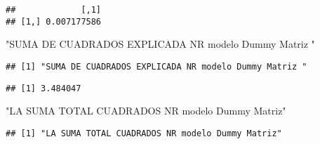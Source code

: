 \documentclass[
]{article}
\newenvironment{Shaded}{\begin{snugshade}}{\end{snugshade}}
\newcommand{\DataTypeTok}[1]{\textcolor[rgb]{0.13,0.29,0.53}{#1}}
\newcommand{\DecValTok}[1]{\textcolor[rgb]{0.00,0.00,0.81}{#1}}
\newcommand{\KeywordTok}[1]{\textcolor[rgb]{0.13,0.29,0.53}{\textbf{#1}}}
\newcommand{\NormalTok}[1]{#1}
\newcommand{\OperatorTok}[1]{\textcolor[rgb]{0.81,0.36,0.00}{\textbf{#1}}}
\newcommand{\StringTok}[1]{\textcolor[rgb]{0.31,0.60,0.02}{#1}}
\begin{document}
\begin{verbatim}
##             [,1]
## [1,] 0.007177586
\end{verbatim}

\begin{Shaded}
\begin{Highlighting}[]
\StringTok{"SUMA DE CUADRADOS EXPLICADA NR modelo Dummy Matriz "}
\end{Highlighting}
\end{Shaded}

\begin{verbatim}
## [1] "SUMA DE CUADRADOS EXPLICADA NR modelo Dummy Matriz "
\end{verbatim}

\begin{Shaded}
\end{Shaded}

\begin{verbatim}
## [1] 3.484047
\end{verbatim}

\begin{Shaded}
\begin{Highlighting}[]
\StringTok{"LA SUMA TOTAL CUADRADOS NR modelo Dummy Matriz"}
\end{Highlighting}
\end{Shaded}

\begin{verbatim}
## [1] "LA SUMA TOTAL CUADRADOS NR modelo Dummy Matriz"
\end{verbatim}

\begin{Shaded}
\end{Shaded}
\end{document}
